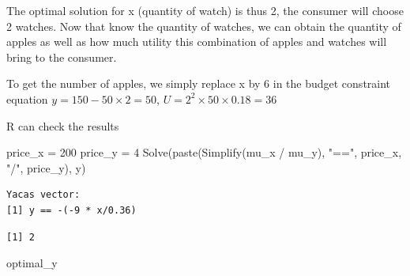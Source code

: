 \documentclass[
  letterpaper,
  DIV=11,
  numbers=noendperiod]{scrreprt}
\newenvironment{Shaded}{\begin{snugshade}}{\end{snugshade}}
\newcommand{\ControlFlowTok}[1]{\textcolor[rgb]{0.00,0.23,0.31}{#1}}
\newcommand{\DecValTok}[1]{\textcolor[rgb]{0.68,0.00,0.00}{#1}}
\newcommand{\FunctionTok}[1]{\textcolor[rgb]{0.28,0.35,0.67}{#1}}
\newcommand{\NormalTok}[1]{\textcolor[rgb]{0.00,0.23,0.31}{#1}}
\newcommand{\OtherTok}[1]{\textcolor[rgb]{0.00,0.23,0.31}{#1}}
\newcommand{\SpecialCharTok}[1]{\textcolor[rgb]{0.37,0.37,0.37}{#1}}
\newcommand{\StringTok}[1]{\textcolor[rgb]{0.13,0.47,0.30}{#1}}
\begin{document}
The optimal solution for x (quantity of watch) is thus 2, the consumer
will choose 2 watches. Now that know the quantity of watches, we can
obtain the quantity of apples as well as how much utility this
combination of apples and watches will bring to the consumer.

To get the number of apples, we simply replace x by 6 in the budget
constraint equation \(y = 150-50 \times 2 = 50\),
\(U = 2^2 \times 50 \times 0.18 = 36\)

R can check the results

\begin{Shaded}
\begin{Highlighting}[]
\NormalTok{price\_x }\OtherTok{=} \DecValTok{200}
\NormalTok{price\_y }\OtherTok{=} \DecValTok{4}
\FunctionTok{Solve}\NormalTok{(}\FunctionTok{paste}\NormalTok{(}\FunctionTok{Simplify}\NormalTok{(mu\_x }\SpecialCharTok{/}\NormalTok{ mu\_y), }\StringTok{"=="}\NormalTok{, price\_x, }\StringTok{"/"}\NormalTok{, price\_y), y)}
\end{Highlighting}
\end{Shaded}

\begin{verbatim}
Yacas vector:
[1] y == -(-9 * x/0.36)
\end{verbatim}

\begin{Shaded}
\end{Shaded}

\begin{verbatim}
[1] 2
\end{verbatim}

\begin{Shaded}
\begin{Highlighting}[]
\NormalTok{optimal\_y}
\end{Highlighting}
\end{Shaded}
\end{document}
